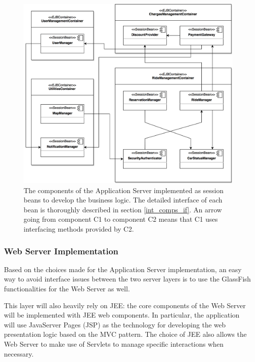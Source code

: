 \begin{figure}[H]
\begin{center}
		\includegraphics[width=\textwidth]{./arch_design/diagrams/app_server_comps.png}
		\caption{The components of the Application Server implemented as session beans to develop the business logic. The detailed interface of each bean is thoroughly described in section \ref{int_comps_if}. An arrow going from component C1 to component C2 means that C1 uses interfacing methods provided by C2.}
		\label{app_server_comps}
\end{center}
\end{figure}

\subsubsection{Web Server Implementation}
Based on the choices made for the Application Server implementation, an easy way to avoid interface issues between the two server layers is to use the GlassFish functionalities for the Web Server as well.

This layer will also heavily rely on JEE: the core components of the Web Server will be implemented with JEE web components. In particular, the application will use JavaServer Pages (JSP) as the technology for developing the web presentation logic based on the MVC pattern. The choice of JEE also allows the Web Server to make use of Servlets to manage specific interactions when necessary.

